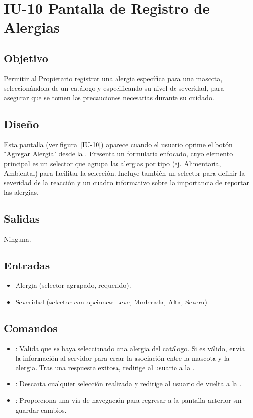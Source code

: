\section{IU-10 Pantalla de Registro de Alergias}

\subsection{Objetivo}
    Permitir al Propietario registrar una alergia específica para una mascota, seleccionándola de un catálogo y especificando su nivel de severidad, para asegurar que se tomen las precauciones necesarias durante su cuidado.

\subsection{Diseño}
    Esta pantalla  (ver figura~\ref{IU-10}) aparece cuando el usuario oprime el botón "Agregar Alergia" desde la . Presenta un formulario enfocado, cuyo elemento principal es un selector que agrupa las alergias por tipo (ej. Alimentaria, Ambiental) para facilitar la selección. Incluye también un selector para definir la severidad de la reacción y un cuadro informativo sobre la importancia de reportar las alergias.


\subsection{Salidas}
    Ninguna.

\subsection{Entradas}
\begin{itemize}
    \item Alergia (selector agrupado, requerido).
    \item Severidad (selector con opciones: Leve, Moderada, Alta, Severa).
\end{itemize}

\subsection{Comandos}
\begin{itemize}
    \item {}: Valida que se haya seleccionado una alergia del catálogo. Si es válido, envía la información al servidor para crear la asociación entre la mascota y la alergia. Tras una respuesta exitosa, redirige al usuario a la .
    \item {}: Descarta cualquier selección realizada y redirige al usuario de vuelta a la .
    \item {}: Proporciona una vía de navegación para regresar a la pantalla anterior sin guardar cambios.
\end{itemize}

